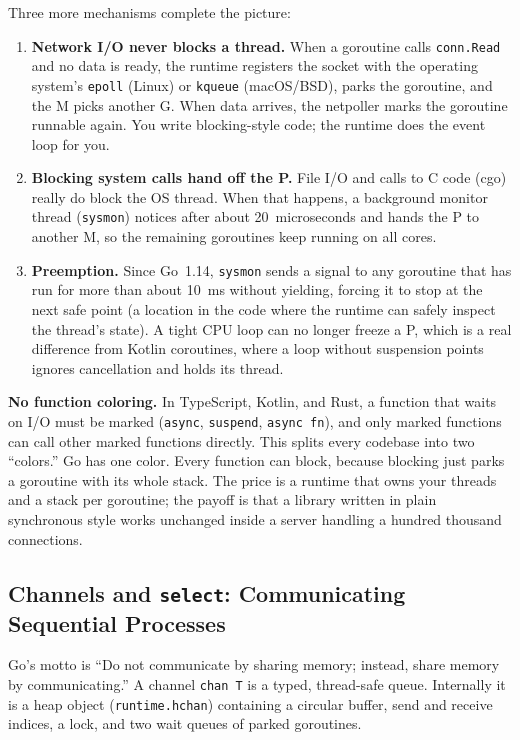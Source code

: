 Three more mechanisms complete the picture:
\begin{enumerate}
  \item \textbf{Network I/O never blocks a thread.} When a goroutine calls \texttt{conn.Read} and no data is ready, the runtime registers the socket with the operating system's \texttt{epoll} (Linux) or \texttt{kqueue} (macOS/BSD), parks the goroutine, and the M picks another G. When data arrives, the netpoller marks the goroutine runnable again. You write blocking-style code; the runtime does the event loop for you.
  \item \textbf{Blocking system calls hand off the P.} File I/O and calls to C code (cgo) really do block the OS thread. When that happens, a background monitor thread (\texttt{sysmon}) notices after about 20~microseconds and hands the P to another M, so the remaining goroutines keep running on all cores.
  \item \textbf{Preemption.} Since Go~1.14, \texttt{sysmon} sends a signal to any goroutine that has run for more than about 10~ms without yielding, forcing it to stop at the next safe point (a location in the code where the runtime can safely inspect the thread's state). A tight CPU loop can no longer freeze a P, which is a real difference from Kotlin coroutines, where a loop without suspension points ignores cancellation and holds its thread.
\end{enumerate}

\begin{focusbox}
\textbf{No function coloring.} In TypeScript, Kotlin, and Rust, a function that waits on I/O must be marked (\texttt{async}, \texttt{suspend}, \texttt{async fn}), and only marked functions can call other marked functions directly. This splits every codebase into two ``colors.'' Go has one color. Every function can block, because blocking just parks a goroutine with its whole stack. The price is a runtime that owns your threads and a stack per goroutine; the payoff is that a library written in plain synchronous style works unchanged inside a server handling a hundred thousand connections.
\end{focusbox}

\subsection{Channels and \texttt{select}: Communicating Sequential Processes}

Go's motto is ``Do not communicate by sharing memory; instead, share memory by communicating.'' A channel \texttt{chan T} is a typed, thread-safe queue. Internally it is a heap object (\texttt{runtime.hchan}) containing a circular buffer, send and receive indices, a lock, and two wait queues of parked goroutines.

